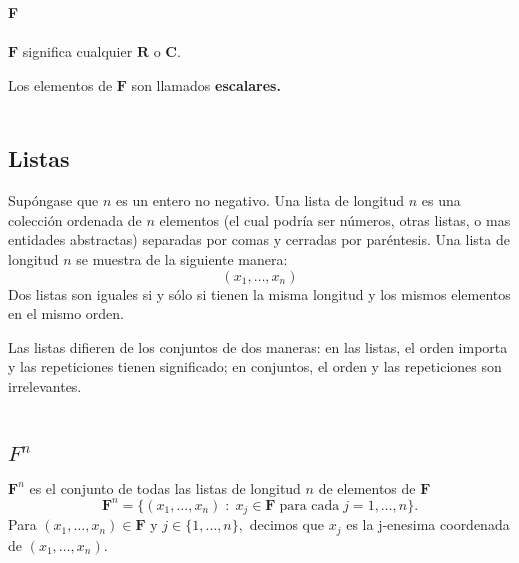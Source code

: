     \begin{mynot}\textbf{F}\;\\\\
	$\textbf{F}$ significa cualquier $\textbf{R}$ o $\textbf{C}$.
    \end{mynot}

Los elementos de $\textbf{F}$ son llamados \textbf{escalares.}\\\\


\subsection*{Listas}

\setcounter{mydef}{7}
    \begin{mydef} 
	Supóngase que $n$ es un entero no negativo. Una lista de longitud $n$ es una colección ordenada de $n$ elementos (el cual podría ser números, otras listas, o mas entidades abstractas) separadas por comas y cerradas por paréntesis. Una lista de longitud $n$ se muestra de la siguiente manera:
	$$(x_1,\ldots,x_n)$$
	Dos listas son iguales si y sólo si tienen la misma longitud y los mismos elementos en el mismo orden.
    \end{mydef}
Las listas difieren de los conjuntos de dos maneras: en las listas, el orden importa y las repeticiones tienen significado; en conjuntos, el orden y las repeticiones son irrelevantes.\\\\


\subsection*{\boldmath $F^n$}

\setcounter{mydef}{9}
    \begin{mydef} 
	$\textbf{F}^n$ es el conjunto de todas las listas de longitud $n$ de elementos de $\textbf{F}$
	$$\textbf{F}^n = \lbrace (x_1,\ldots, x_n)\; : \; x_j \in \textbf{F} \; \mbox{para cada}\; j = 1,\ldots, n\rbrace.$$
	Para $(x_1,\ldots, x_n)\in \textbf{F}$ y $j\in \lbrace 1, \ldots, n\rbrace,$ decimos que $x_j$ es la j-enesima coordenada de $(x_1,\ldots, x_n)$.
    \end{mydef}

